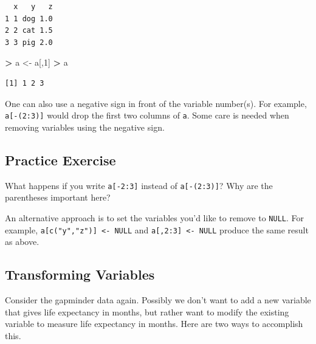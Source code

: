 \documentclass[]{krantz}
\makeatletter
\newenvironment{Shaded}{\begin{snugshade}}{\end{snugshade}}
\newcommand{\KeywordTok}[1]{\textcolor[rgb]{0.27,0.27,0.27}{\textbf{#1}}}
\newcommand{\DecValTok}[1]{\textcolor[rgb]{0.06,0.06,0.06}{#1}}
\newcommand{\StringTok}[1]{\textcolor[rgb]{0.5,0.5,0.5}{#1}}
\newcommand{\OperatorTok}[1]{\textcolor[rgb]{0.43,0.43,0.43}{\textbf{#1}}}
\newcommand{\NormalTok}[1]{#1}
\newenvironment{kframe}{%
\medskip{}
\setlength{\fboxsep}{.8em}
 \def\at@end@of@kframe{}%
 \ifinner\ifhmode%
  \def\at@end@of@kframe{\end{minipage}}%
  \begin{minipage}{\columnwidth}%
 \fi\fi%
 \def\FrameCommand##1{\hskip\@totalleftmargin \hskip-\fboxsep
 \colorbox{shadecolor}{##1}\hskip-\fboxsep
     \hskip-\linewidth \hskip-\@totalleftmargin \hskip\columnwidth}%
 \MakeFramed {\advance\hsize-\width
   \@totalleftmargin\z@ \linewidth\hsize
   \@setminipage}}%
 {\par\unskip\endMakeFramed%
 \at@end@of@kframe}
\renewenvironment{Shaded}{\begin{kframe}}{\end{kframe}}
\makeatother
\begin{document}
\begin{verbatim}
  x   y   z
1 1 dog 1.0
2 2 cat 1.5
3 3 pig 2.0
\end{verbatim}

\begin{Shaded}
\begin{Highlighting}[]
\OperatorTok{>}\StringTok{ }\NormalTok{a <-}\StringTok{ }\NormalTok{a[,}\DecValTok{1}\NormalTok{]}
\OperatorTok{>}\StringTok{ }\NormalTok{a}
\end{Highlighting}
\end{Shaded}

\begin{verbatim}
[1] 1 2 3
\end{verbatim}

One can also use a negative sign in front of the variable number(s). For
example, \texttt{a{[}-(2:3){]}} would drop the first two columns of
\texttt{a}. Some care is needed when removing variables using the
negative sign.

\subsection{Practice Exercise}\label{practice-exercise-6}

What happens if you write \texttt{a{[}-2:3{]}} instead of
\texttt{a{[}-(2:3){]}}? Why are the parentheses important here?

An alternative approach is to set the variables you'd like to remove to
\texttt{NULL}. For example,
\texttt{a{[}c("y","z"){]}\ \textless{}-\ NULL} and
\texttt{a{[},2:3{]}\ \textless{}-\ NULL} produce the same result as
above.

\subsection{Transforming Variables}\label{transforming-variables}

Consider the gapminder data again. Possibly we don't want to add a new
variable that gives life expectancy in months, but rather want to modify
the existing variable to measure life expectancy in months. Here are two
ways to accomplish this.

\begin{Shaded}
\end{Shaded}
\end{document}
